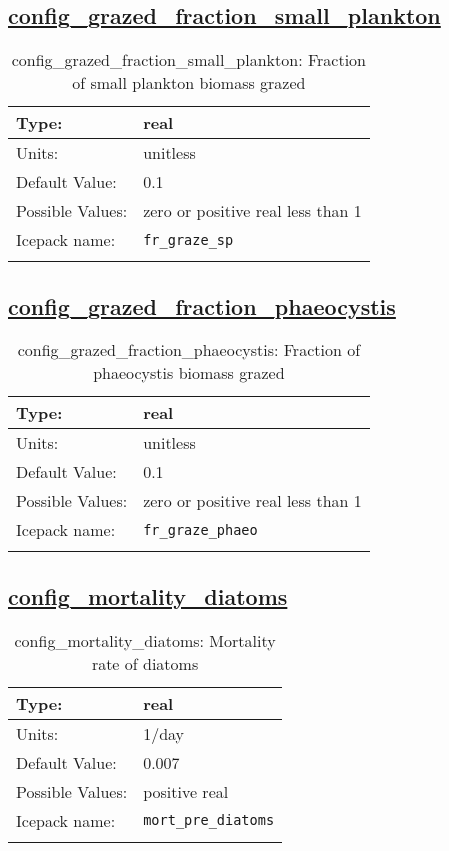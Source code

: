 \subsection[config\_grazed\_fraction\_small\_plankton]{\hyperref[sec:nm_tab_biogeochemistry]{config\_grazed\_fraction\_small\_plankton}}
\label{subsec:nm_sec_config_grazed_fraction_small_plankton}
\begin{center}
\begin{longtable}{| p{2.0in} || p{4.0in} |}
    \hline
    Type: & real \\
    \hline
    Units: & \si{unitless} \\
    \hline
    Default Value: & 0.1 \\
    \hline
    Possible Values: & zero or positive real less than 1 \\
    \hline
    \hline
    Icepack name: & \verb+fr_graze_sp+ \\
    \caption{config\_grazed\_fraction\_small\_plankton: Fraction of small plankton biomass grazed}
\end{longtable}
\end{center}
\subsection[config\_grazed\_fraction\_phaeocystis]{\hyperref[sec:nm_tab_biogeochemistry]{config\_grazed\_fraction\_phaeocystis}}
\label{subsec:nm_sec_config_grazed_fraction_phaeocystis}
\begin{center}
\begin{longtable}{| p{2.0in} || p{4.0in} |}
    \hline
    Type: & real \\
    \hline
    Units: & \si{unitless} \\
    \hline
    Default Value: & 0.1 \\
    \hline
    Possible Values: & zero or positive real less than 1 \\
    \hline
    \hline
    Icepack name: & \verb+fr_graze_phaeo+ \\
    \caption{config\_grazed\_fraction\_phaeocystis: Fraction of phaeocystis biomass grazed}
\end{longtable}
\end{center}
\subsection[config\_mortality\_diatoms]{\hyperref[sec:nm_tab_biogeochemistry]{config\_mortality\_diatoms}}
\label{subsec:nm_sec_config_mortality_diatoms}
\begin{center}
\begin{longtable}{| p{2.0in} || p{4.0in} |}
    \hline
    Type: & real \\
    \hline
    Units: & \si{1/day} \\
    \hline
    Default Value: & 0.007 \\
    \hline
    Possible Values: & positive real \\
    \hline
    \hline
    Icepack name: & \verb+mort_pre_diatoms+ \\
    \caption{config\_mortality\_diatoms: Mortality rate of diatoms}
\end{longtable}
\end{center}
